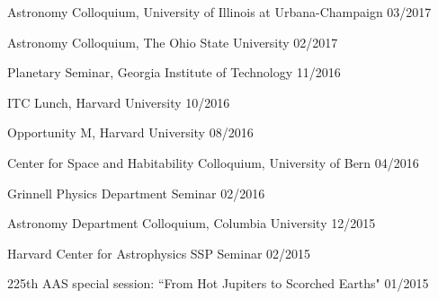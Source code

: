 \documentclass[12pt,letterpaper]{article}
\begin{document}
\begin{list}{}{\cvlist}
\item {Astronomy Colloquium, University of Illinois at Urbana-Champaign \hfill 03/2017}
\item {Astronomy Colloquium, The Ohio State University \hfill 02/2017}
\item {Planetary Seminar, Georgia Institute of Technology \hfill 11/2016}
\item {ITC Lunch, Harvard University \hfill 10/2016}
\item {Opportunity M, Harvard University \hfill 08/2016}
\item {Center for Space and Habitability Colloquium, University of Bern \hfill 04/2016}
\item {Grinnell Physics Department Seminar \hfill 02/2016}
\item {Astronomy Department Colloquium, Columbia University \hfill 12/2015}
\item {Harvard Center for Astrophysics SSP Seminar \hfill 02/2015}
\item {225th AAS special session: ``From Hot Jupiters to Scorched Earths" \hfill 01/2015}
\end{list}
\end{document}
